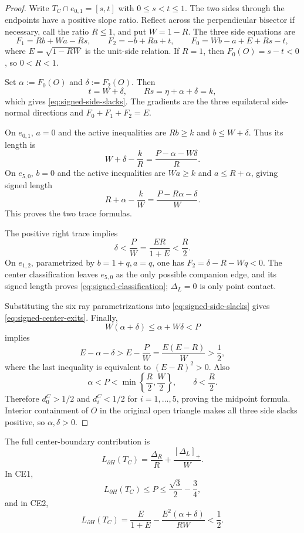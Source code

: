 \begin{proof}
Write $T_C\cap e_{0,1}=[s,t]$ with $0\le s<t\le1$.  The two sides through
the endpoints have a positive slope ratio.  Reflect across the perpendicular
bisector if necessary, call the ratio $R\le1$, and put $W=1-R$.  The three
side equations are
\[
 F_1=Rb+Wa-Rs,\qquad
 F_2=-b+Ra+t,\qquad
 F_0=Wb-a+E+Rs-t,
\]
where $E=\sqrt{1-RW}$ is the unit-side relation.  If $R=1$, then
$F_0(O)=s-t<0$, so $0<R<1$.

Set $\alpha:=F_0(O)$ and $\delta:=F_2(O)$.  Then
\[
 t=W+\delta,\qquad Rs=\eta+\alpha+\delta=k,
\]
which gives \eqref{eq:signed-side-slacks}.  The gradients are the three
equilateral side-normal directions and $F_0+F_1+F_2=E$.

On $e_{0,1}$, $a=0$ and the active inequalities are
$Rb\ge k$ and $b\le W+\delta$.  Thus its length is
\[
 W+\delta-\frac{k}{R}
 =\frac{P-\alpha-W\delta}{R}.
\]
On $e_{5,0}$, $b=0$ and the active inequalities are
$Wa\ge k$ and $a\le R+\alpha$, giving signed length
\[
 R+\alpha-\frac{k}{W}
 =\frac{P-R\alpha-\delta}{W}.
\]
This proves the two trace formulas.

The positive right trace implies
\[
 \delta<\frac{P}{W}=\frac{ER}{1+E}<\frac R2.
\]
On $e_{1,2}$, parametrized by $b=1+q,a=q$, one has
$F_2=\delta-R-Wq<0$.  The center classification leaves $e_{5,0}$ as the only
possible companion edge, and its signed length proves
\eqref{eq:signed-classification}; $\Delta_L=0$ is only point contact.

Substituting the six ray parametrizations into
\eqref{eq:signed-side-slacks} gives \eqref{eq:signed-center-exits}.  Finally,
\[
 W(\alpha+\delta)\le\alpha+W\delta<P
\]
implies
\[
 E-\alpha-\delta>E-\frac PW
 =\frac{E(E-R)}W>\frac12,
\]
where the last inequality is equivalent to $(E-R)^2>0$.  Also
\[
 \alpha<P<\min\left\{\frac R2,\frac W2\right\},
 \qquad\delta<\frac R2.
\]
Therefore $d_0^C>1/2$ and $d_i^C<1/2$ for $i=1,\ldots,5$, proving the
midpoint formula.  Interior containment of $O$ in the original open triangle
makes all three side slacks positive, so $\alpha,\delta>0$.
\end{proof}



\begin{corollary}
\label{cor:signed-center-boundary}
The full center-boundary contribution is
\begin{equation}
 L_{\partial H}(T_C)
 =\frac{\Delta_R}{R}+\frac{[\Delta_L]_+}{W}.
 \label{eq:signed-boundary-length}
\end{equation}
In CE1,
\[
 L_{\partial H}(T_C)\le P\le\frac{\sqrt3}{2}-\frac34,
\]
and in CE2,
\[
 L_{\partial H}(T_C)
 =\frac{E}{1+E}-\frac{E^2(\alpha+\delta)}{RW}<\frac12.
\]
\end{corollary}

